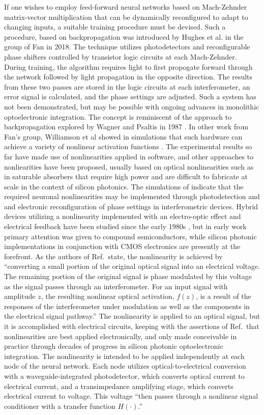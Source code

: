 If one wishes to employ feed-forward neural networks based on Mach-Zehnder matrix-vector multiplication that can be dynamically reconfigured to adapt to changing inputs, a suitable training procedure must be devised. Such a procedure, based on backpropagation was introduced by Hughes et al. in the group of Fan in 2018. The technique utilizes photodetectors and reconfigurable phase shifters controlled by transistor logic circuits at each Mach-Zehnder. During training, the algorithm requires light to first propogate forward through the network followed by light propagation in the opposite direction. The results from these two passes are stored in the logic circuits at each interferometer, an error signal is calculated, and the phase settings are adjusted. Such a system has not been demonstrated, but may be possible with ongoing advances in monolithic optoelectronic integration. The concept is reminiscent of the approach to backpropagation explored by Wagner and Psaltis in 1987 \cite{waps1987}. In other work from Fan's group, Williamson et al showed in simulations that such hardware can achieve a variety of nonlinear activation functions \cite{wihu2019}. The experimental results so far \cite{shha2017} have made use of nonlinearities applied in software, and other approaches to nonliearities have been proposed, usually based on optical nonlinearities such as in saturable absorbers that require high power and are difficult to fabricate at scale in the context of silicon photonics. The simulations of \cite{wihu2019} indicate that the required neuronal nonlinearities may be implemented through photodetection and and electronic reconfiguration of phase settings in interferometric devices. Hybrid devices utilizing a nonlinearity implemented with an electro-optic effect and electrical feedback have been studied since the early 1980s \cite{sm1980,ko1981}, but in early work primary attention was given to compound semiconductors, while silicon photonic implementations in conjunction with CMOS electronics are presently at the forefront. As the authors of Ref.\,\cite{wihu2019} state, the nonlinearity is achieved by ``converting a small portion of the original optical signal into an electrical voltage. The remaining portion of the original signal is phase modulated by this voltage as the signal passes through an interferometer. For an input signal with amplitude $z$, the resulting nonlinear optical activation, $f(z)$, is a result of the responses of the interferometer under modulation as well as the components in the electrical signal pathway.'' The nonlinearity is applied to an optical signal, but it is accomplished with electrical circuits, keeping with the assertions of Ref.\,\cite{juyu1996} that nonlinearities are best applied electronically, and only made conceivable in practice through decades of progress in silicon photonic optoelectronic integration. The nonlinearity is intended to be applied independently at each node of the neural network. Each node utilizes optical-to-electrical conversion with a waveguide-integrated photodetector, which converts optical current to electrical current, and a transimpedance amplifying stage, which converts electrical current to voltage. This voltage ``then passes through a nonlinear signal conditioner with a transfer function $H(\cdot)$.'' 